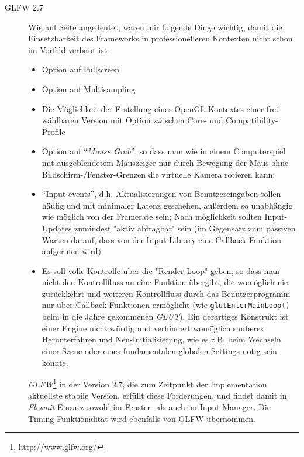 \begin{description}
    	
   		\item[GLFW 2.7]
		Wie auf Seite \pageref{focus:dependencies} angedeutet, waren mir folgende Dinge wichtig, damit die Einsetzbarkeit
		des Frameworks in professionelleren Kontexten nicht schon im Vorfeld verbaut ist:
		\begin{itemize}
			\item Option auf Fullscreen
			\item Option auf Multisampling
			\item Die Möglichkeit der Erstellung eines OpenGL-Kontextes einer frei wählbaren Version 
			mit Option zwischen Core- und Compatibility-Profile
			\item Option auf "`\emph{Mouse Grab}"', so dass man wie in einem Computerspiel mit ausgeblendetem Mauszeiger
			nur durch Bewegung der Maus ohne Bildschirm-/Fenster-Grenzen die virtuelle Kamera rotieren kann;
			\item "`Input events"', d.h. Aktualisierungen von Benutzereingaben sollen häufig und mit minimaler 
			Latenz geschehen, außerdem so unabhängig wie möglich von der Framerate sein;
			Nach möglichkeit sollten Input-Updates zumindest "aktiv abfragbar" sein 
			(im Gegensatz zum passiven Warten darauf, dass von der Input-Library eine Callback-Funktion 
			aufgerufen wird)
			\item Es soll volle Kontrolle über die "Render-Loop" geben, so dass man nicht 
			den Kontrollfluss an eine Funktion übergibt, die womöglich nie zurückkehrt und weiteren Kontrollfluss
			durch das Benutzerprogramm	nur über Callback-Funktionen ermöglicht
			(wie \lstinline[language=C]|glutEnterMainLoop()| beim in die Jahre gekommenen \emph{GLUT}).
			Ein derartiges Konstrukt ist einer
			Engine nicht würdig und verhindert womöglich sauberes Herunterfahren und Neu-Initialisierung,
			wie es z.B. beim Wechseln einer Szene oder eines fundamentalen globalen Settings nötig sein könnte.	
		\end{itemize}
		\emph{GLFW}\footnote{http://www.glfw.org/} in der Version 2.7, die zum Zeitpunkt der Implementation aktuellste 
		stabile	Version, erfüllt diese Forderungen, und findet damit in \emph{Flewnit} Einsatz sowohl im Fenster- als auch 	
		im Input-Manager. Die Timing-Funktionalität wird ebenfalls von GLFW übernommen.
		

\end{description}
